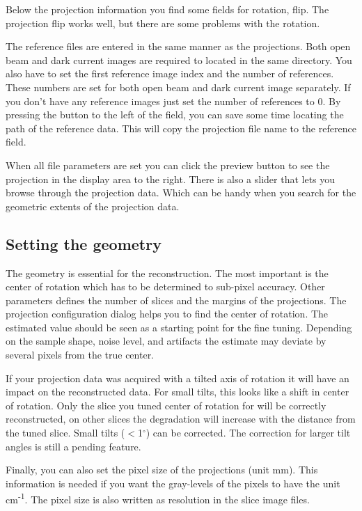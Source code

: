 \documentclass[a4paper]{scrreprt}
\begin{document}
Below the projection information you find some fields for rotation, flip. The projection flip works well, but there are some problems with the rotation.

The reference files are entered in the same manner as the projections. Both open beam and dark current images are required to located in the same directory. You also have to set the first reference image index and the number of references. These numbers are set for both open beam and dark current image separately. If you don't have any reference images just set the number of references to 0. By pressing the button to the left of the field, you can save some time locating the path of the reference data. This will copy the projection file name to the reference field.

When all file parameters are set you can click the preview button to see the projection in the display area to the right. There is also a slider that lets you browse through the projection data. Which can be handy when you search for the geometric extents of the projection data.

\subsection{Setting the geometry}
The geometry is essential for the reconstruction. The most important is the center of rotation which has to be determined to sub-pixel accuracy. Other parameters defines the number of slices and the margins of the projections. The projection configuration dialog helps you to find the center of rotation. The estimated value should be seen as a starting point for the fine tuning. Depending on the sample shape, noise level, and artifacts the estimate may deviate by several pixels from the true center. 

If your projection data was acquired with a tilted axis of rotation it will have an impact on the reconstructed data. For small tilts, this looks like a shift in center of rotation. Only the slice you tuned center of rotation for will be correctly reconstructed, on other slices the degradation will increase with the distance from the tuned slice. 
Small tilts ($<$1$^{\circ}$) can be corrected. The correction for larger tilt angles is still a pending feature.

Finally, you can also set the pixel size of the projections (unit mm). This information is needed if you want the gray-levels of the pixels to have the unit cm\textsuperscript{-1}. The pixel size is also written as resolution in the slice image files.
\end{document}
